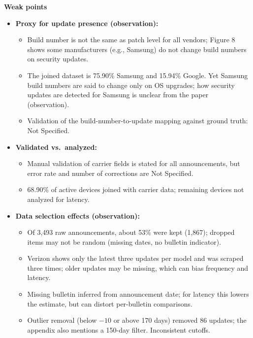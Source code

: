\documentclass[11pt,a4paper]{article}
\begin{document}
\begin{enumerate}
    \vspace{4pt}
    \textbf{Weak points}
    \begin{itemize}[leftmargin=*, itemsep=1pt, topsep=2pt]
        \item \textbf{Proxy for update presence (observation):}
        \begin{itemize}[itemsep=0pt]
            \item Build number is not the same as patch level for all vendors; Figure 8 shows some manufacturers (e.g., Samsung) do not change build numbers on security updates.
            \item The joined dataset is 75.90\% Samsung and 15.94\% Google. Yet Samsung build numbers are said to change only on OS upgrades; how security updates are detected for Samsung is unclear from the paper (observation).
            \item Validation of the build-number-to-update mapping against ground truth: Not Specified.
        \end{itemize}
        \item \textbf{Validated vs.\ analyzed:}
        \begin{itemize}[itemsep=0pt]
            \item Manual validation of carrier fields is stated for all announcements, but error rate and number of corrections are Not Specified.
            \item 68.90\% of active devices joined with carrier data; remaining devices not analyzed for latency.
        \end{itemize}
        \item \textbf{Data selection effects (observation):}
        \begin{itemize}[itemsep=0pt]
            \item Of 3,493 raw announcements, about 53\% were kept (1,867); dropped items may not be random (missing dates, no bulletin indicator).
            \item Verizon shows only the latest three updates per model and was scraped three times; older updates may be missing, which can bias frequency and latency.
            \item Missing bulletin inferred from announcement date; for latency this lowers the estimate, but can distort per-bulletin comparisons.
            \item Outlier removal (below $-10$ or above 170 days) removed 86 updates; the appendix also mentions a 150-day filter. Inconsistent cutoffs.
        \end{itemize}

\end{itemize}
\end{enumerate}
\end{document}
